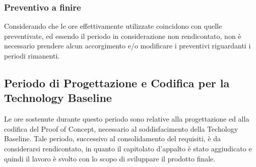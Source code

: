 \subsubsection{Preventivo a finire} 
Considerando che le ore effettivamente utilizzate coincidono con quelle preventivate, ed essendo il periodo in considerazione non rendicontato, non è necessario prendere alcun accorgimento e/o modificare i preventivi riguardanti i periodi rimanenti.

\subsection{Periodo di Progettazione e Codifica per la Technology Baseline}
Le ore sostenute durante questo periodo sono relative alla progettazione ed alla codifica del Proof of Concept\glo, necessario al soddisfacimento della Techology Baseline\glo. Tale periodo, successivo al consolidamento del requisiti, è da considerarsi rendicontato, in quanto il capitolato d'appalto è stato aggiudicato e quindi il lavoro è svolto con lo scopo di sviluppare il prodotto finale. 

